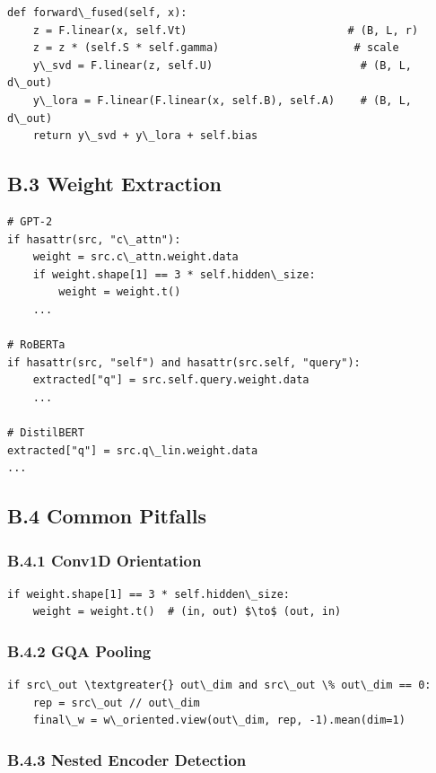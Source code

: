 \begin{lstlisting}
def forward\_fused(self, x):
    z = F.linear(x, self.Vt)                         # (B, L, r)
    z = z * (self.S * self.gamma)                     # scale
    y\_svd = F.linear(z, self.U)                       # (B, L, d\_out)
    y\_lora = F.linear(F.linear(x, self.B), self.A)    # (B, L, d\_out)
    return y\_svd + y\_lora + self.bias
\end{lstlisting}

\subsection{B.3 Weight Extraction}

\begin{lstlisting}
# GPT-2
if hasattr(src, "c\_attn"):
    weight = src.c\_attn.weight.data
    if weight.shape[1] == 3 * self.hidden\_size:
        weight = weight.t()
    ...

# RoBERTa
if hasattr(src, "self") and hasattr(src.self, "query"):
    extracted["q"] = src.self.query.weight.data
    ...

# DistilBERT
extracted["q"] = src.q\_lin.weight.data
...
\end{lstlisting}

\subsection{B.4 Common Pitfalls}

\subsubsection{B.4.1 Conv1D Orientation}

\begin{lstlisting}
if weight.shape[1] == 3 * self.hidden\_size:
    weight = weight.t()  # (in, out) $\to$ (out, in)
\end{lstlisting}

\subsubsection{B.4.2 GQA Pooling}

\begin{lstlisting}
if src\_out \textgreater{} out\_dim and src\_out \% out\_dim == 0:
    rep = src\_out // out\_dim
    final\_w = w\_oriented.view(out\_dim, rep, -1).mean(dim=1)
\end{lstlisting}

\subsubsection{B.4.3 Nested Encoder Detection}

